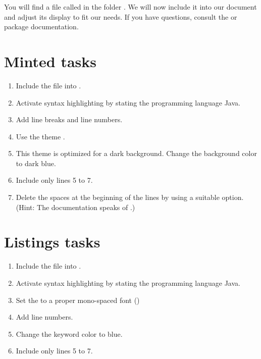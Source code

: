 You will find a file called  in the folder 
.
We will now include it into our document and adjust its display to fit our needs.
If you have questions, consult the  or  package documentation.

\section*{Minted tasks}

\begin{enumerate}
  \item Include the file into 
  .
  \item Activate syntax highlighting by stating the programming language Java.
  \item Add line breaks and line numbers.
  \item Use the theme .
  \item This theme is optimized for a dark background. Change the background color to dark blue.
  \item Include only lines 5 to 7.
  \item Delete the spaces at the beginning of the lines by using a suitable 
  option. (Hint: The documentation speaks of .)
\end{enumerate}

\section*{Listings tasks}

\begin{enumerate}
  \item Include the file into 
  .
  \item Activate syntax highlighting by stating the programming language Java.
  \item Set the  to a proper mono-spaced font ()
  \item Add line numbers.
  \item Change the keyword color to blue.
  \item Include only lines 5 to 7.
\end{enumerate}



